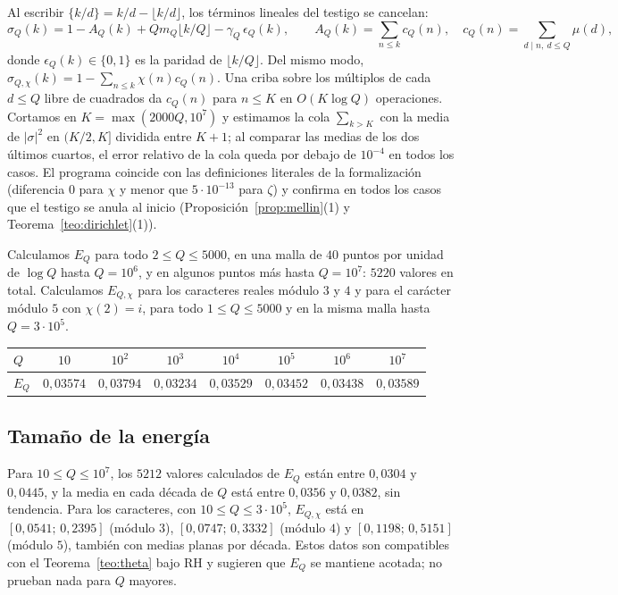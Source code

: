 \documentclass[11pt,a4paper]{amsart}
\theoremstyle{definition}
\theoremstyle{remark}
\begin{document}
Al escribir $\{k/d\}=k/d-\lfloor k/d\rfloor$, los t\'erminos lineales del testigo se cancelan:
\[
\sigma_Q(k)=1-A_Q(k)+Qm_Q\lfloor k/Q\rfloor-\gamma_Q\,\epsilon_Q(k),\qquad
A_Q(k)=\sum_{n\le k}c_Q(n),\quad c_Q(n)=\sum_{d\mid n,\ d\le Q}\mu(d),
\]
donde $\epsilon_Q(k)\in\{0,1\}$ es la paridad de $\lfloor k/Q\rfloor$. Del mismo modo, $\sigma_{Q,\chi}(k)=1-\sum_{n\le k}\chi(n)c_Q(n)$. Una criba sobre los m\'ultiplos de cada $d\le Q$ libre de cuadrados da $c_Q(n)$ para $n\le K$ en $O(K\log Q)$ operaciones. Cortamos en $K=\max(2000Q,10^7)$ y estimamos la cola $\sum_{k>K}$ con la media de $|\sigma|^2$ en $(K/2,K]$ dividida entre $K+1$; al comparar las medias de los dos \'ultimos cuartos, el error relativo de la cola queda por debajo de $10^{-4}$ en todos los casos. El programa coincide con las definiciones literales de la formalizaci\'on (diferencia $0$ para $\chi$ y menor que $5\cdot10^{-13}$ para $\zeta$) y confirma en todos los casos que el testigo se anula al inicio (Proposici\'on~\ref{prop:mellin}(1) y Teorema~\ref{teo:dirichlet}(1)).

Calculamos $E_Q$ para todo $2\le Q\le5000$, en una malla de $40$ puntos por unidad de $\log Q$ hasta $Q=10^6$, y en algunos puntos m\'as hasta $Q=10^7$: $5220$ valores en total. Calculamos $E_{Q,\chi}$ para los caracteres reales m\'odulo $3$ y $4$ y para el car\'acter m\'odulo $5$ con $\chi(2)=i$, para todo $1\le Q\le5000$ y en la misma malla hasta $Q=3\cdot10^5$.

\begin{center}
\begin{tabular}{lccccccc}
\toprule
$Q$ & $10$ & $10^2$ & $10^3$ & $10^4$ & $10^5$ & $10^6$ & $10^7$\\
\midrule
$E_Q$ & $0{,}03574$ & $0{,}03794$ & $0{,}03234$ & $0{,}03529$ & $0{,}03452$ & $0{,}03438$ & $0{,}03589$\\
\bottomrule
\end{tabular}
\end{center}

\subsection*{Tama\~no de la energ\'ia}
Para $10\le Q\le10^7$, los $5212$ valores calculados de $E_Q$ est\'an entre $0{,}0304$ y $0{,}0445$, y la media en cada d\'ecada de $Q$ est\'a entre $0{,}0356$ y $0{,}0382$, sin tendencia. Para los caracteres, con $10\le Q\le3\cdot10^5$, $E_{Q,\chi}$ est\'a en $[0{,}0541;\,0{,}2395]$ (m\'odulo $3$), $[0{,}0747;\,0{,}3332]$ (m\'odulo $4$) y $[0{,}1198;\,0{,}5151]$ (m\'odulo $5$), tambi\'en con medias planas por d\'ecada. Estos datos son compatibles con el Teorema~\ref{teo:theta} bajo RH y sugieren que $E_Q$ se mantiene acotada; no prueban nada para $Q$ mayores.
\end{document}
